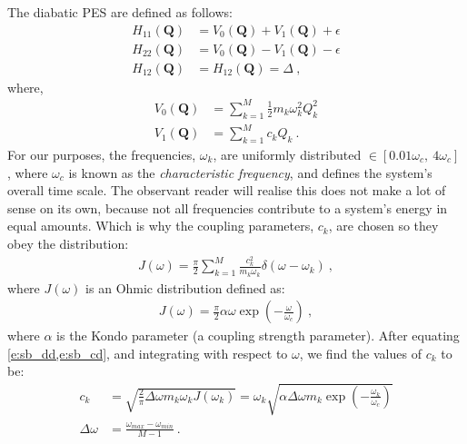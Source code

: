 The diabatic PES are defined as follows:
\begin{subequations}\label{e:sbpes}
\begin{align}
H_{11}(\bm{Q}) &= V_{0}(\bm{Q}) + V_{1}(\bm{Q}) + \epsilon \\
H_{22}(\bm{Q}) &= V_{0}(\bm{Q}) - V_{1}(\bm{Q}) - \epsilon \\
H_{12}(\bm{Q}) &= H_{12}(\bm{Q}) = \Delta~,
\end{align}
\end{subequations}
where,
\begin{subequations}
\begin{align}
V_{0}(\bm{Q}) &= \sum\limits_{k=1}^{M} \frac{1}{2} m_{k} \omega_{k}^{2} Q_{k}^{2} \\
V_{1}(\bm{Q}) &= \sum\limits_{k=1}^{M} c_{k} Q_{k}~.
\end{align}
\end{subequations}
For our purposes, the frequencies, $ \omega_{k} $, are uniformly distributed $ \in [0.01 \omega_{c},~4 \omega_{c}] $ \cite{spin-boson}, where $ \omega_{c} $ is known as the \emph{characteristic frequency}, and defines the system's overall time scale. The observant reader will realise this does not make a lot of sense on its own, because not all frequencies contribute to a system's energy in equal amounts. Which is why the coupling parameters, $ c_{k} $, are chosen so they obey the distribution:
\begin{align}\label{e:sb_dd}
J(\omega) = \frac{\pi}{2} \sum\limits_{k=1}^{M} \frac{c_{k}^{2}}{m_{k} \omega_{k}}  \delta(\omega - \omega_{k})~,
\end{align}
where $ J(\omega) $ is an Ohmic distribution defined as:
\begin{align}\label{e:sb_cd}
J(\omega) = \frac{\pi}{2} \alpha \omega \exp\left(-\frac{\omega}{\omega_{c}}\right)~,
\end{align}
where $ \alpha $ is the Kondo parameter (a coupling strength parameter). After equating \cref{e:sb_dd,e:sb_cd}, and integrating with respect to $ \omega $, we find the values of $ c_{k} $ to be:
\begin{subequations}
\begin{align}
c_{k} & = \sqrt{\frac{2}{\pi} \Delta \omega m_{k} \omega_{k} J(\omega_{k})}
= \omega_{k} \sqrt{\alpha \Delta \omega m_{k} \exp\left(-\frac{\omega_{k}}{\omega_{c}}\right)} \\
\Delta \omega &= \frac{\omega_{max} - \omega_{min}}{M - 1}~.
\end{align}
\end{subequations}

